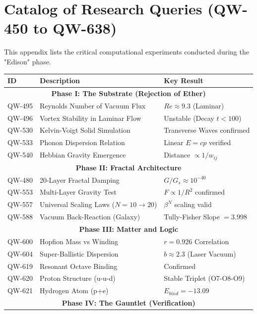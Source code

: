 \documentclass[11pt, a4paper]{report}
\begin{document}
\chapter{Catalog of Research Queries (QW-450 to QW-638)}
\label{chap:catalog}

This appendix lists the critical computational experiments conducted during the "Edison" phase.

\begin{small}
\begin{longtable}{|p{2cm}|p{8cm}|p{4cm}|}
\hline
\textbf{ID} & \textbf{Description} & \textbf{Key Result} \\
\hline
\endhead
\hline
\multicolumn{3}{|c|}{\textbf{Phase I: The Substrate (Rejection of Ether)}} \\
\hline
QW-495 & Reynolds Number of Vacuum Flux & $Re \approx 9.3$ (Laminar) \\
QW-496 & Vortex Stability in Laminar Flow & Unstable (Decay $t < 100$) \\
QW-530 & Kelvin-Voigt Solid Simulation & Transverse Waves confirmed \\
QW-533 & Phonon Dispersion Relation & Linear $E=cp$ verified \\
QW-540 & Hebbian Gravity Emergence & Distance $\propto 1/w_{ij}$ \\
\hline
\multicolumn{3}{|c|}{\textbf{Phase II: Fractal Architecture}} \\
\hline
QW-480 & 20-Layer Fractal Damping & $G/G_s \approx 10^{-40}$ \\
QW-553 & Multi-Layer Gravity Test & $F \propto 1/R^2$ confirmed \\
QW-557 & Universal Scaling Laws ($N=10 \to 20$) & $\beta^N$ scaling valid \\
QW-588 & Vacuum Back-Reaction (Galaxy) & Tully-Fisher Slope $= 3.998$ \\
\hline
\multicolumn{3}{|c|}{\textbf{Phase III: Matter and Logic}} \\
\hline
QW-600 & Hopfion Mass vs Winding & $r = 0.926$ Correlation \\
QW-604 & Super-Ballistic Dispersion & $b \approx 2.3$ (Laser Vacuum) \\
QW-619 & Resonant Octave Binding & Confirmed \\
QW-620 & Proton Structure (u-u-d) & Stable Triplet (O7-O8-O9) \\
QW-621 & Hydrogen Atom (p+e) & $E_{bind} = -13.09$ \\
\hline
\multicolumn{3}{|c|}{\textbf{Phase IV: The Gauntlet (Verification)}} \\

\end{longtable}
\end{small}
\end{document}
